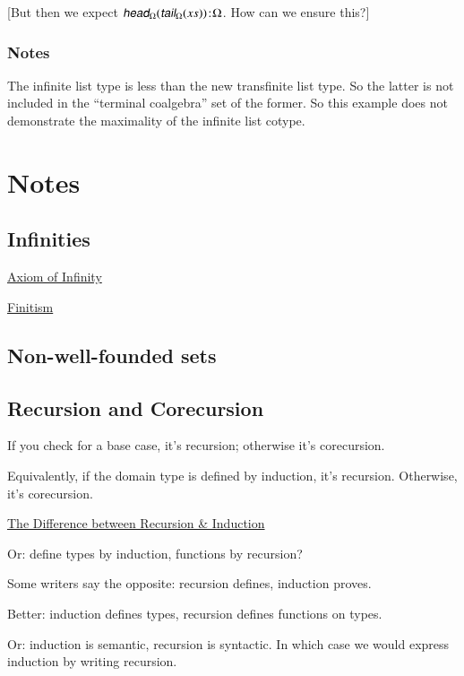 \documentclass{article}
\begin{document}
[But then we expect \(\tj{\xcohead(\xcotail(\seq{x}))}{\Omega}\). How can we ensure this?]

\subsubsection{Notes}

The infinite list type is less than the new transfinite list type. So
the latter is not included in the ``terminal coalgebra'' set of the
former. So this example does not demonstrate the maximality of the
infinite list cotype.

\section{Notes}

\subsection{Infinities}

\href{https://en.wikipedia.org/wiki/Axiom_of_infinity}{Axiom of Infinity}

\href{https://en.wikipedia.org/wiki/Finitism}{Finitism}

\subsection{Non-well-founded sets}

 \cite{nonwf_deduction}

\subsection{Recursion and Corecursion}

If you check for a base case, it's recursion; otherwise it's
corecursion.

Equivalently, if the domain type is defined by induction, it's recursion. Otherwise, it's corecursion.

\href{http://blog.ezyang.com/2013/04/the-difference-between-recursion-induction/}{The Difference between Recursion \& Induction}

Or: define types by induction, functions by recursion?

Some writers say the opposite: recursion defines, induction proves.

Better: induction defines types, recursion defines functions on types.

Or: induction is semantic, recursion is syntactic. In which case we would express induction by writing recursion.
\end{document}
